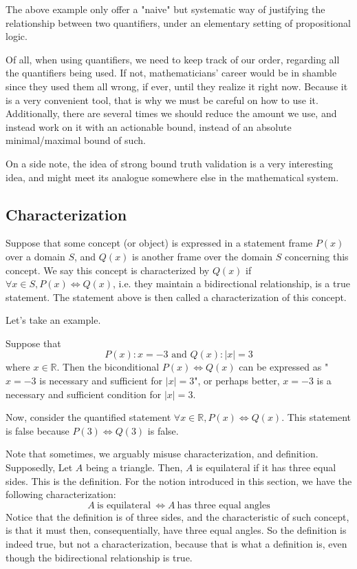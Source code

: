 The above example only offer a "naive" but systematic way of justifying the relationship between two quantifiers, under an elementary setting of propositional logic. 

Of all, when using quantifiers, we need to keep track of our order, regarding all the quantifiers being used. If not, mathematicians' career would be in shamble since they used them all wrong, if ever, until they realize it right now. Because it is a very convenient tool, that is why we must be careful on how to use it. Additionally, there are several times we should reduce the amount we use, and instead work on it with an actionable bound, instead of an absolute minimal/maximal bound of such. 

On a side note, the idea of strong bound truth validation is a very interesting idea, and might meet its analogue somewhere else in the mathematical system. 

\subsection{Characterization}
Suppose that some concept (or object) is expressed in a statement frame $P(x)$ over a domain $S$, and $Q(x)$ is another frame over the domain $S$ concerning this concept. We say this concept is characterized by $Q(x)$ if $\forall x\in S, P(x)\iff Q(x)$, i.e. they maintain a bidirectional relationship, is a true statement. The statement above is then called a characterization  of this concept.

Let's take an example. 

\begin{example}
    Suppose that 
    \[P(x): x= -3 \text{ and } Q(x): | x| = 3\] where $x\in \mathbb{R}$. Then the biconditional $P(x)\iff Q(x)$ can be expressed as "$x=-3$ is necessary and sufficient for $|x|=3$", or perhaps better, $x=-3$ is a necessary and sufficient condition for $|x|=3$. 

    Now, consider the quantified statement $\forall x\in \mathbb{R}, P(x)\iff Q(x)$. This statement is false because $P(3)\iff Q(3)$ is false. 
\end{example}

Note that sometimes, we arguably misuse characterization, and definition. Supposedly, Let $A$ being a triangle. Then, $A$ is equilateral if it has three equal sides. This is the definition. For the notion introduced in this section, we have the following characterization: 
\begin{equation*}
    A \: \text{is equilateral} \: \iff A \: \text{has three equal angles}
\end{equation*}
Notice that the definition is of three sides, and the characteristic of such concept, is that it must then, consequentially, have three equal angles. So the definition is indeed true, but not a characterization, because that is what a definition is, even though the bidirectional relationship is true. 

